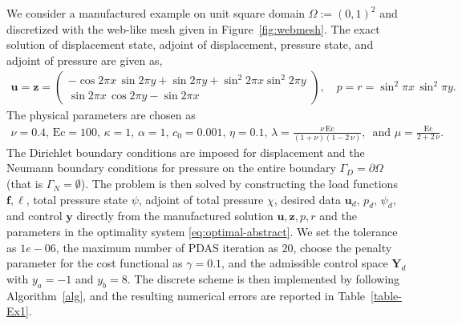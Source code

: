 \documentclass[smallextended]{svjour3}
\numberwithin{equation}{section}
\numberwithin{figure}{section}
\numberwithin{table}{section}
\newcommand\ff{\boldsymbol{f}}
\newcommand\by{\boldsymbol{y}}
\newcommand\bu{\boldsymbol{u}}
\newcommand\bz{\boldsymbol{z}}
\newcommand{\bY}{\boldsymbol{Y}}
\begin{document}
		We consider a manufactured example on unit square domain $\Omega:= (0,1)^2$ and discretized with the web-like mesh given in Figure~\ref{fig:webmesh}.
        The exact solution of displacement state, adjoint of displacement, pressure state, and adjoint of pressure are given as, 
		\begin{align*}
			\bu = \bz=
			\begin{pmatrix}
				- \cos 2 \pi x \,\sin 2 \pi y+ \sin 2\pi y+\sin^2 2 \pi x \sin^2 2\pi y \\
				\sin 2 \pi x \, \cos 2 \pi y- \sin 2 \pi x
			\end{pmatrix}, \quad
			p=r= \sin^2\pi x \, \sin^2\pi y.
		\end{align*}
		The physical parameters are chosen as
		\begin{align*}
			\nu=0.4, \, \text{Ec}=100, \, \kappa=1, \, \alpha=1, \, c_0=0.001,\, \eta=0.1, \, \lambda=\frac{\nu \, \text{Ec}}{(1+ \nu) (1-2 \, \nu)}, \, \text{ and } 		\mu=\frac{\text{Ec}}{2+2 \, \nu}.
		\end{align*}
        The Dirichlet boundary conditions are imposed for displacement and the Neumann boundary conditions for pressure on the entire boundary $\Gamma_D = \partial \Omega$ (that is $\Gamma_N = \emptyset$). The problem is then solved by constructing the load functions $\ff, \ell$, total pressure state $\psi$, adjoint of total pressure $\chi$, desired data $\bu_d, \, p_d, \, \psi_d$, and control $\by$ directly from the manufactured solution $\bu, \bz, p,  r$ and the parameters in the optimality system \eqref{eq:optimal-abstract}. We set the tolerance as $1e-06$, the maximum number of PDAS iteration as $20$, choose the penalty parameter for the cost functional as $\gamma=0.1$, and the admissible control space $\bY_d$ with $y_a=-1$ and $y_b=8.$ The discrete scheme is then implemented by following Algorithm~\ref{alg}, and the resulting numerical errors are reported in Table~\ref{table-Ex1}.
		
\end{document}
